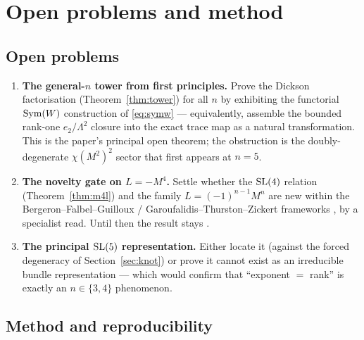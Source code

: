 \section{Open problems and method}
\label{sec:open}

\subsection{Open problems}

\begin{enumerate}[leftmargin=1.6em]
\item \textbf{The general-$n$ tower from first principles.} Prove the Dickson
  factorisation (Theorem~\ref{thm:tower}) for all $n$ by exhibiting the functorial
  $\operatorname{Sym}(W)$ construction of \eqref{eq:symw} --- equivalently, assemble the bounded
  rank-one $e_2/\Lambda^2$ closure into the exact trace map as a natural transformation.
  This is the paper's principal open theorem; the obstruction is the doubly-degenerate
  $\chi(M^2)^2$ sector that first appears at $n=5$.
\item \textbf{The novelty gate on $L=-M^4$.} Settle whether the $\mathrm{SL}(4)$ relation
  (Theorem~\ref{thm:m4l}) and the family $L=(-1)^{n-1}M^n$ are new within the
  Bergeron--Falbel--Guilloux / Garoufalidis--Thurston--Zickert frameworks
  \cite{bfg2014,gtz2015}, by a specialist read. Until then the result stays \sGated.
\item \textbf{The principal $\mathrm{SL}(5)$ representation.} Either locate it (against the forced
  degeneracy of Section~\ref{sec:knot}) or prove it cannot exist as an irreducible bundle
  representation --- which would confirm that ``exponent $=$ rank'' is exactly an
  $n\in\{3,4\}$ phenomenon.
\end{enumerate}

\subsection{Method and reproducibility}

